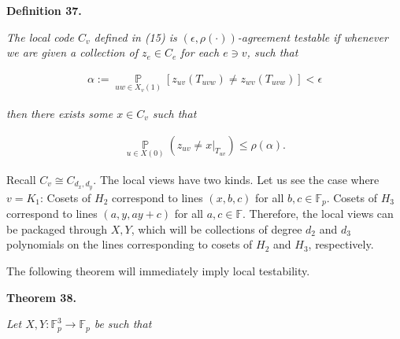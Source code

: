 

\par\medskip\noindent\textbf{
\textbf{Definition 37}\textbf{.}
}\par



\emph{The local code $C_{v}$ defined in (15) is $(\epsilon,\rho(\cdot))$-agreement testable if whenever we are given a collection of $z_{e}\in C_{e}$ for each $e\ni v$, such that}\par


\[\begin{gathered}
\alpha:=\operatorname*{\mathbb{P}}_{uw\in X_{v}(1)}[z_{uv}(T_{uvw})\neq z_{wv}(T_{uvw})]<\epsilon
\end{gathered}\]


\emph{then there exists some $x\in C_{v}$ such that}\par


\[\begin{gathered}
\operatorname*{\mathbb{P}}_{u\in X(0)}(z_{uv}\neq x|_{T_{uv}})\leq\rho(\alpha).
\end{gathered}\]






Recall $C_{v}\cong C_{d_{x},d_{y}}$. The local views have two kinds. Let us see the case where $v=K_{1}$: Cosets of $H_{2}$ correspond to lines $(x,b,c)$ for all $b,c\in\mathbb{F}_{p}$. Cosets of $H_{3}$ correspond to lines $(a,y,ay+c)$ for all $a,c\in\mathbb{F}$.
Therefore, the local views can be packaged through $X,Y$, which will be collections of degree $d_{2}$ and $d_{3}$ polynomials on the lines corresponding to cosets of $H_{2}$ and $H_{3}$, respectively.\par




The following theorem will immediately imply local testability.\par





\par\medskip\noindent\textbf{
\textbf{Theorem 38}\textbf{.}
}\par



\emph{Let $X,Y:\mathbb{F}_{p}^{3}\to\mathbb{F}_{p}$ be such that}\par


